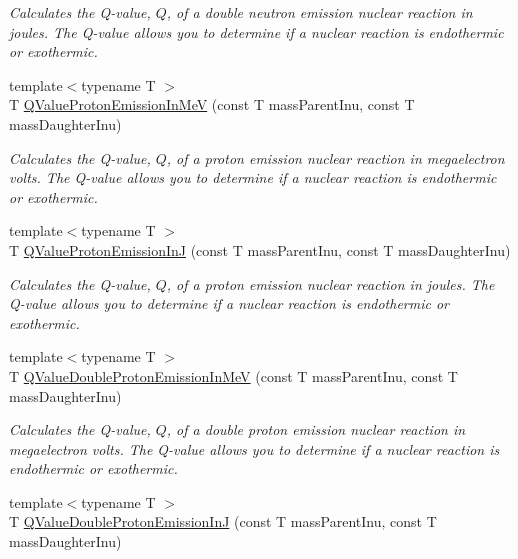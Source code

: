 \begin{DoxyCompactItemize}
\begin{DoxyCompactList}\small\item\em Calculates the Q-\/value, $Q$, of a double neutron emission nuclear reaction in joules. The Q-\/value allows you to determine if a nuclear reaction is endothermic or exothermic. \end{DoxyCompactList}\item 
{\footnotesize template$<$typename T $>$ }\\T \mbox{\hyperlink{group___e_g_x_phys-_q_value-_proton_emission_ga5d92756e945e66bd2ed7d55145b95c3b}{Q\+Value\+Proton\+Emission\+In\+MeV}} (const T mass\+Parent\+Inu, const T mass\+Daughter\+Inu)
\begin{DoxyCompactList}\small\item\em Calculates the Q-\/value, $Q$, of a proton emission nuclear reaction in megaelectron volts. The Q-\/value allows you to determine if a nuclear reaction is endothermic or exothermic. \end{DoxyCompactList}\item 
{\footnotesize template$<$typename T $>$ }\\T \mbox{\hyperlink{group___e_g_x_phys-_q_value-_proton_emission_ga41f19b0d9a2dc06e89de44aaa2d48d62}{Q\+Value\+Proton\+Emission\+InJ}} (const T mass\+Parent\+Inu, const T mass\+Daughter\+Inu)
\begin{DoxyCompactList}\small\item\em Calculates the Q-\/value, $Q$, of a proton emission nuclear reaction in joules. The Q-\/value allows you to determine if a nuclear reaction is endothermic or exothermic. \end{DoxyCompactList}\item 
{\footnotesize template$<$typename T $>$ }\\T \mbox{\hyperlink{group___e_g_x_phys-_q_value-_proton_emission_ga61d07711da603f2f4426fbb3f271fc34}{Q\+Value\+Double\+Proton\+Emission\+In\+MeV}} (const T mass\+Parent\+Inu, const T mass\+Daughter\+Inu)
\begin{DoxyCompactList}\small\item\em Calculates the Q-\/value, $Q$, of a double proton emission nuclear reaction in megaelectron volts. The Q-\/value allows you to determine if a nuclear reaction is endothermic or exothermic. \end{DoxyCompactList}\item 
{\footnotesize template$<$typename T $>$ }\\T \mbox{\hyperlink{group___e_g_x_phys-_q_value-_proton_emission_gab8979dd25aeac115834a4a8b233fec6f}{Q\+Value\+Double\+Proton\+Emission\+InJ}} (const T mass\+Parent\+Inu, const T mass\+Daughter\+Inu)

\end{DoxyCompactItemize}
